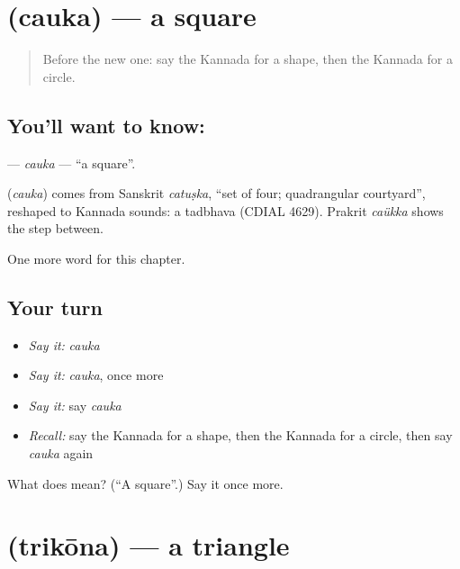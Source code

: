 \section[\texorpdfstring{\kn{ಚೌಕ} (cauka)}{ಚೌಕ (cauka)}]{ (cauka) — a square}

\label{lesson:KA-C193-cauka}



\begin{quote}
Before the new one: say the Kannada for a shape, then the Kannada for a circle.
\end{quote}

\subsection*{You'll want to know: }
\textbf{} — \emph{cauka} — \textquotedblleft{}a square\textquotedblright{}.

\begin{cousinweb}
\textbf{} (\emph{cauka}) comes from Sanskrit \emph{catuṣka}, \textquotedblleft{}set of four; quadrangular courtyard\textquotedblright{}, reshaped to Kannada sounds: a tadbhava (CDIAL 4629). Prakrit \emph{caükka} shows the step between.
\end{cousinweb}

\begin{grammarlens}[title={What you've built}]
One more word for this chapter.
\end{grammarlens}

\subsection*{Your turn}
\begin{itemize}
\raggedright
  \item \emph{Say it:} \emph{cauka}
  \item \emph{Say it:} \emph{cauka}, once more
  \item \emph{Say it:} say \emph{cauka}
  \item \emph{Recall:} say the Kannada for a shape, then the Kannada for a circle, then say \emph{cauka} again
\end{itemize}

\begin{tcolorbox}[breakable,colback=teal!4,colframe=teal!35!black,title={Before you move on}]
What does  mean? (\textquotedblleft{}A square\textquotedblright{}.) Say it once more.
\end{tcolorbox}
\section[\texorpdfstring{\kn{ತ್ರಿಕೋನ} (trikōna)}{ತ್ರಿಕೋನ (trikōna)}]{ (trikōna) — a triangle}

